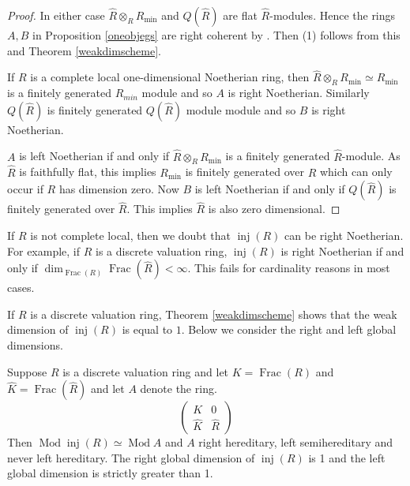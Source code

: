 \documentclass[12pt,oneside]{amsart}
\DeclareMathOperator{\Mod}{Mod}
\DeclareMathOperator{\inj}{inj}
\DeclareMathOperator{\Frac}{Frac}
\begin{document}
\begin{proof}
In either case $\widehat{R} \otimes_R R_{\min}$ and $Q(\widehat{R})$ are flat $\widehat{R}$-modules. Hence the rings $A,B$ in Proposition \ref{oneobjegs} are right coherent by \cite[Theorem 4.2]{HMV12}. Then (1) follows from this and Theorem \ref{weakdimscheme}. 


If $R$ is a complete local one-dimensional Noetherian ring, then  $\widehat{R} \otimes_R R_{\min} \simeq R_{\min}$ is a finitely generated $R_{min}$ module and so $A$ is right Noetherian. Similarly $Q(\widehat{R})$ is finitely generated $Q(\widehat{R})$ module module and so $B$ is right Noetherian.


$A$ is left Noetherian if and only if $\widehat{R} \otimes_R R_{\min}$ is a finitely generated $\widehat{R}$-module. As $\widehat{R}$ is faithfully flat, this implies $R_{\min}$ is finitely generated over $R$ which can only occur if $R$ has dimension zero. Now $B$ is left Noetherian if and only if $Q(\widehat{R})$ is finitely generated over $\widehat{R}$. This implies $\widehat{R}$ is also zero dimensional. 
\end{proof}



\begin{remark} \label{notnoetheg2}
If $R$ is not complete local, then we doubt that $\inj(R)$ can be right Noetherian. For example, if $R$ is a discrete valuation ring, $\inj(R)$ is right Noetherian if and only if $\dim_{\Frac(R)} \Frac(\widehat{R}) < \infty$. This fails for cardinality reasons in most cases. 
\end{remark}




If $R$ is a discrete valuation ring, Theorem \ref{weakdimscheme} shows that the weak dimension of $\inj(R)$ is equal to $1$. Below we consider the right and left global dimensions.

\begin{prop} \label{dvreg}
Suppose $R$ is a discrete valuation ring and let $K = \Frac(R)$ and $\widehat{K} = \Frac(\widehat{R})$ and let $A$ denote the ring. 
\[
\begin{pmatrix}
K & 0 \\
\widehat{K} & \widehat{R} 
\end{pmatrix}
\]
Then $\Mod \inj(R) \simeq \Mod A$ and $A$ right hereditary, left semihereditary and never left hereditary. The right global dimension of $\inj(R)$ is 1 and the left global dimension is strictly greater than 1.
\end{prop}
\end{document}
